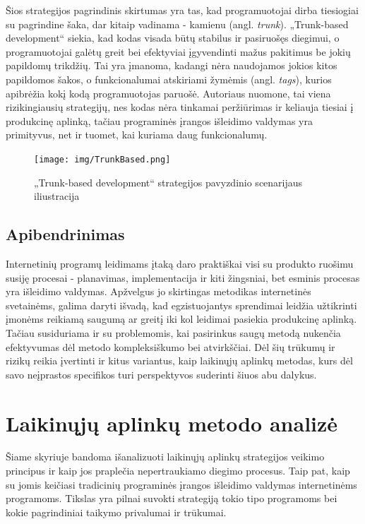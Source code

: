 \documentclass{VUMIFPSkursinis}
\begin{document}

Šios strategijos pagrindinis skirtumas yra tas, kad programuotojai dirba tiesiogiai su pagrindine šaka, dar kitaip vadinama - kamienu (angl. \textit{trunk}). „Trunk-based development“ siekia, kad kodas visada būtų stabilus ir pasiruošęs diegimui, o programuotojai galėtų greit bei efektyviai įgyvendinti mažus pakitimus be jokių papildomų trikdžių. Tai yra įmanoma, kadangi nėra naudojamos jokios kitos papildomos šakos, o funkcionalumai atskiriami žymėmis (angl. \textit{tags}), kurios apibrėžia kokį kodą programuotojas paruošė. Autoriaus nuomone, tai viena rizikingiausių strategijų, nes kodas nėra tinkamai peržiūrimas ir keliauja tiesiai į produkcinę aplinką, tačiau programinės įrangos išleidimo valdymas yra primityvus, net ir tuomet, kai kuriama daug funkcionalumų.

\begin{figure}[H]
    \centering
    \texttt{[image: img/TrunkBased.png]}
    \caption{„Trunk-based development“ strategijos pavyzdinio scenarijaus iliustracija}
    \label{img:mlp}
\end{figure}

\subsection{Apibendrinimas}
Internetinių programų leidimams įtaką daro praktiškai visi su produkto ruošimu susiję procesai - planavimas, implementacija ir kiti žingsniai, bet esminis procesas yra išleidimo valdymas. Apžvelgus jo skirtingas metodikas internetinės svetainėms, galima daryti išvadą, kad egzistuojantys sprendimai leidžia užtikrinti įmonėms reikiamą saugumą ar greitį iki kol leidimai pasiekia produkcinę aplinką. Tačiau susiduriama ir su problemomis, kai pasirinkus saugų metodą nukenčia efektyvumas dėl metodo kompleksiškumo bei atvirkščiai. Dėl šių trūkumų ir rizikų reikia įvertinti ir kitus variantus, kaip laikinųjų aplinkų metodas, kurs dėl savo neįprastos specifikos turi perspektyvos suderinti šiuos abu dalykus. 

\section{Laikinųjų aplinkų metodo analizė}

Šiame skyriuje bandoma išanalizuoti laikinųjų aplinkų strategijos veikimo principus ir kaip jos praplečia nepertraukiamo diegimo procesus. Taip pat, kaip su jomis keičiasi tradicinių programinės įrangos išleidimo valdymas internetinėms programoms. Tikslas yra pilnai suvokti strategiją tokio tipo programoms bei kokie pagrindiniai taikymo privalumai ir trūkumai.
\end{document}
